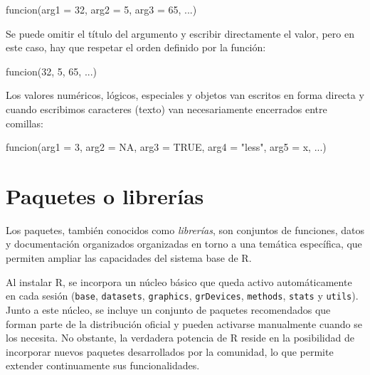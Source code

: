 \documentclass[
  spanish,
  a4paper,
]{scrbook}
\newenvironment{Shaded}{\begin{snugshade}}{\end{snugshade}}
\newcommand{\AttributeTok}[1]{\textcolor[rgb]{0.40,0.45,0.13}{#1}}
\newcommand{\ConstantTok}[1]{\textcolor[rgb]{0.56,0.35,0.01}{#1}}
\newcommand{\DecValTok}[1]{\textcolor[rgb]{0.68,0.00,0.00}{#1}}
\newcommand{\FunctionTok}[1]{\textcolor[rgb]{0.28,0.35,0.67}{#1}}
\newcommand{\NormalTok}[1]{\textcolor[rgb]{0.00,0.23,0.31}{#1}}
\newcommand{\StringTok}[1]{\textcolor[rgb]{0.13,0.47,0.30}{#1}}
\begin{document}
\begin{Shaded}
\begin{Highlighting}[]
\FunctionTok{funcion}\NormalTok{(}\AttributeTok{arg1 =} \DecValTok{32}\NormalTok{, }\AttributeTok{arg2 =} \DecValTok{5}\NormalTok{, }\AttributeTok{arg3 =} \DecValTok{65}\NormalTok{, ...)}
\end{Highlighting}
\end{Shaded}

Se puede omitir el título del argumento y escribir directamente el
valor, pero en este caso, hay que respetar el orden definido por la
función:

\begin{Shaded}
\begin{Highlighting}[]
\FunctionTok{funcion}\NormalTok{(}\DecValTok{32}\NormalTok{, }\DecValTok{5}\NormalTok{, }\DecValTok{65}\NormalTok{, ...)}
\end{Highlighting}
\end{Shaded}

Los valores numéricos, lógicos, especiales y objetos van escritos en
forma directa y cuando escribimos caracteres (texto) van necesariamente
encerrados entre comillas:

\begin{Shaded}
\begin{Highlighting}[]
\FunctionTok{funcion}\NormalTok{(}\AttributeTok{arg1 =} \DecValTok{3}\NormalTok{, }\AttributeTok{arg2 =} \ConstantTok{NA}\NormalTok{, }\AttributeTok{arg3 =} \ConstantTok{TRUE}\NormalTok{, }\AttributeTok{arg4 =} \StringTok{"less"}\NormalTok{, }\AttributeTok{arg5 =}\NormalTok{ x, ...)}
\end{Highlighting}
\end{Shaded}

\section{Paquetes o librerías}\label{paquetes-o-libreruxedas}

Los paquetes, también conocidos como \emph{librerías}, son conjuntos de
funciones, datos y documentación organizados organizadas en torno a una
temática específica, que permiten ampliar las capacidades del sistema
base de R.

Al instalar R, se incorpora un núcleo básico que queda activo
automáticamente en cada sesión (\texttt{base}, \texttt{datasets},
\texttt{graphics}, \texttt{grDevices}, \texttt{methods}, \texttt{stats}
y \texttt{utils}). Junto a este núcleo, se incluye un conjunto de
paquetes recomendados que forman parte de la distribución oficial y
pueden activarse manualmente cuando se los necesita. No obstante, la
verdadera potencia de R reside en la posibilidad de incorporar nuevos
paquetes desarrollados por la comunidad, lo que permite extender
continuamente sus funcionalidades.
\end{document}

